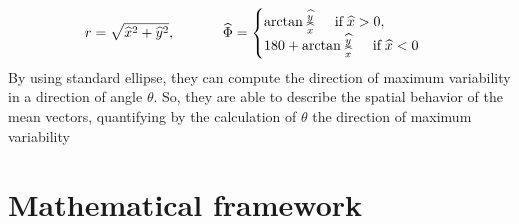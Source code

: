 \documentclass[12pt]{article}
\renewcommand{\hat}{\widehat}
\theoremstyle{Theorem}
\begin{document}
\begin{equation*}
r=\sqrt{\hat{x}^{2} + \hat{y}^{2}}, \; \hspace{1cm} \; \hat{\Phi} = \begin{cases} \arctan{\frac{\hat{y}}{\hat{x}}} \hspace{0.5cm} \text{if} \; \hat{x} > 0 , \\
180 + \arctan{\frac{\hat{y}}{\hat{x}}} \hspace{0.5cm} \text{if} \; \hat{x} < 0 
\end{cases}
\end{equation*}
By using standard ellipse, they can compute the direction of maximum variability in a direction of angle $\theta$. So, they are able to describe the spatial behavior of the mean vectors, quantifying by the calculation of $\theta$ the direction of maximum variability

\section{Mathematical framework}\label{section1}
\end{document}
